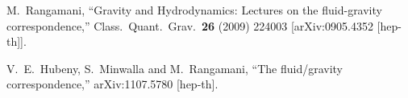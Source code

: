 \documentclass[12pt,notitlepage,a4paper]{article}
\begin{document}
\begin{thebibliography}{99.}
  
  
  






 
  M.~Rangamani,
  ``Gravity and Hydrodynamics: Lectures on the fluid-gravity correspondence,''
  Class.\ Quant.\ Grav.\  {\bf 26} (2009) 224003
  [arXiv:0905.4352 [hep-th]].
 
 
  V.~E.~Hubeny, S.~Minwalla and M.~Rangamani,
  ``The fluid/gravity correspondence,''
  arXiv:1107.5780 [hep-th].
  
 
  
 \end{thebibliography}




%
\end{document}
